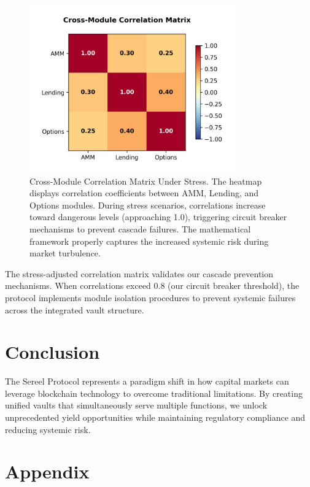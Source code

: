 \documentclass[12pt]{article}
\begin{document}
\begin{figure}[h]
    \centering
    \includegraphics[width=0.8\textwidth]{correlation_matrix.jpg}
    \caption{Cross-Module Correlation Matrix Under Stress. The heatmap displays correlation coefficients between AMM, Lending, and Options modules. During stress scenarios, correlations increase toward dangerous levels (approaching 1.0), triggering circuit breaker mechanisms to prevent cascade failures. The mathematical framework properly captures the increased systemic risk during market turbulence.}
    \label{fig:correlation_matrix}
\end{figure}

The stress-adjusted correlation matrix validates our cascade prevention mechanisms. When correlations exceed 0.8 (our circuit breaker threshold), the protocol implements module isolation procedures to prevent systemic failures across the integrated vault structure.

\section{Conclusion}

The Sereel Protocol represents a paradigm shift in how capital markets can leverage blockchain technology to overcome traditional limitations. By creating unified vaults that simultaneously serve multiple functions, we unlock unprecedented yield opportunities while maintaining regulatory compliance and reducing systemic risk.



\appendix

\section{Appendix}
\end{document}
